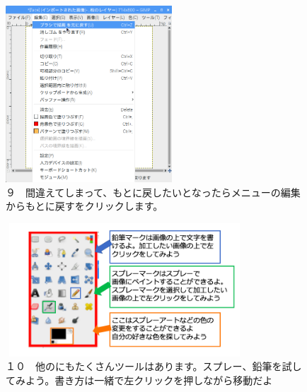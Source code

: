 \documentclass[a4paper,12pt]{jarticle}
\begin{document}
\begin{figure}[ht]
	\begin{minipage}{\textwidth}
\begin{minipage}{6.984cm}
\includegraphics[width=6.228cm,height=6.618cm]{textbook-img132.png}\\
９　間違えてしまって、もとに戻したいとなったらメニューの編集からもとに戻すをクリックします。
\end{minipage}
\hfill
\begin{minipage}{8.966cm}
\includegraphics[width=8.881cm,height=4.997cm]{textbook-img133.png}\\
１０　他のにもたくさんツールはあります。スプレー、鉛筆を試してみよう。書き方は一緒で左クリックを押しながら移動だよ
\end{minipage}
\end{minipage}
\end{figure}

~
\end{document}
